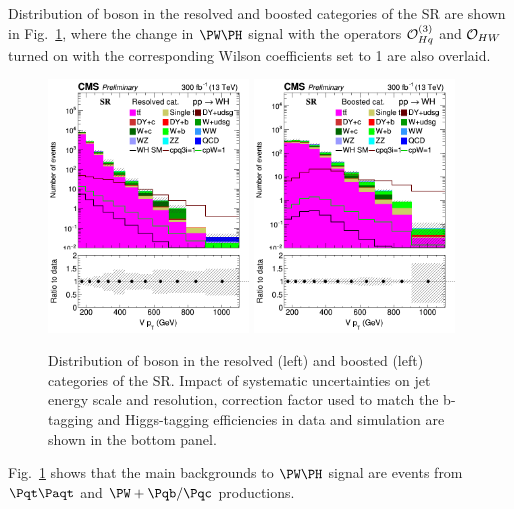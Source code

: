 \documentclass[a4paper,11pt]{article}
\newcommand{\Pb}{{{\Pqb}}\xspace}
\newcommand{\Pt}{{{\Pqt}}\xspace}
\newcommand{\Pc}{{{\Pqc}}\xspace}
\newcommand{\PAt}{{{{\Paqt}}}\xspace}
\begin{document}
Distribution of \PW boson \pt in the resolved and boosted categories of the SR are shown in Fig.~\ref{fig:RECO_Vpt_WH}, where the change in $\PW\PH$ signal with the operators ${\cal O}^{(3)}_{Hq}$ and ${\cal O}_{HW}$ turned on with the corresponding Wilson coefficients set to 1 are also overlaid. 
\begin{figure}[hbtp]
\begin{center}
\includegraphics[width=0.475\textwidth]{Figures/RECO/Plot_Resolved_SR_V_pt.png}
\includegraphics[width=0.475\textwidth]{Figures/RECO/Plot_Boosted_SR_V_pt.png}
\end{center}
\caption{
Distribution of \PW boson \pt in the resolved (left) and boosted (left) categories of the SR. Impact of systematic uncertainties on jet energy scale and resolution, correction factor used to match the b-tagging and Higgs-tagging efficiencies in data and simulation are shown in the bottom panel.
}
\label{fig:RECO_Vpt_WH}
\end{figure}
Fig.~\ref{fig:RECO_Vpt_WH} shows that the main backgrounds to $\PW\PH$ signal are events from $\Pt\PAt$ and ${\PW}+\Pb/\Pc$ productions.
\end{document}
